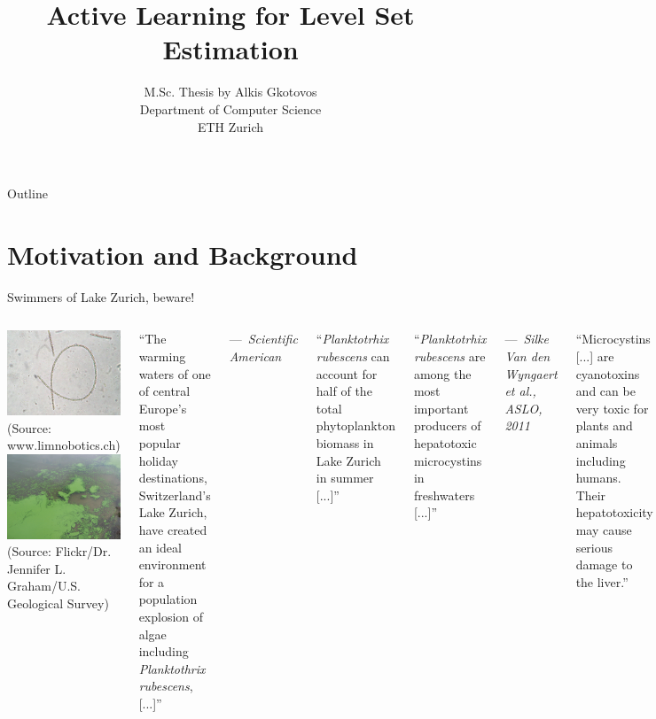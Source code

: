 \documentclass[10pt]{beamer}
\title[Active Learning for Level Set Estimation]
{Active Learning for Level Set Estimation}
\author[Alkis Gkotovos]{
\footnotesize
M.Sc. Thesis by Alkis Gkotovos\\
Department of Computer Science\\
ETH Zurich
}
\date[M.Sc. Thesis presentation]{
\footnotesize
Supervised by Prof. Andreas Krause

}
\newcommand{\qauth}[1]{{\footnotesize\par\normalfont\hfill---\ \emph{#1}\par}}
\begin{document}
\begin{frame}
  \titlepage
\end{frame}

\begin{frame}{Outline}
  \tableofcontents
\end{frame}


\section{Motivation and Background}

\begin{frame}
\begin{center}
Swimmers of Lake Zurich, beware!
\vspace{0.2in}
\begin{columns}[c]
\minipage[c][0.75\textheight][s]{\columnwidth}
\includegraphics[width=1.7in]{figures/pr.jpeg}\\[-0.5em]
{\tiny (Source: www.limnobotics.ch)}\\
\vfill
\includegraphics[width=1.7in]{figures/bloom.jpg}\\[-0.5em]
{\tiny (Source: Flickr/Dr. Jennifer L. Graham/U.S. Geological Survey)}
\endminipage

\minipage[c][0.75\textheight][s]{\columnwidth}
{\small
``The warming waters of one of central Europe's most popular holiday
destinations, Switzerland's Lake Zurich, have created an ideal environment
for a population explosion of algae including \emph{Planktothrix rubescens},
[...]''
\qauth{Scientific American}
\vfill

``\emph{Planktotrhix rubescens} can account for half of the total
phytoplankton biomass in Lake Zurich in summer [...]''
\vfill

``\emph{Planktotrhix rubescens} are among the most important
producers of hepatotoxic microcystins in freshwaters [...]''
\qauth{Silke Van den Wyngaert \emph{et al.}, ASLO, 2011}
\vfill

``Microcystins [...] are cyanotoxins and can be very toxic for plants and
animals including humans.
Their hepatotoxicity may cause serious damage to the liver.''}
\qauth{Wikipedia}
\endminipage
\end{columns}
\end{center}
\end{frame}
\end{document}

